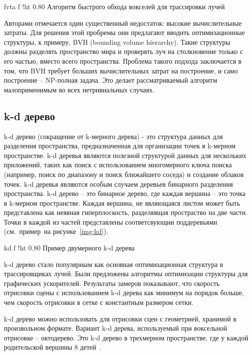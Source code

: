     {fvta}
    {f}
    {!ht}
    {0.80\textwidth}
    {Алгоритм быстрого обхода вокселей для трассировки лучей~\cite{AFVTAfRT}}

Авторами отмечается один существенный недостаток: высокие вычислительные затраты. Для решения
этой пробремы они предлагают вводить оптимизационные структуры, к примеру, BVH (bounding volume hierarchy). 
Такие структуры должны разделять пространство мира
и проверять луч на столкновение только с его частью, вместо всего пространства. Проблема такого 
подхода заключается в том, что BVH требует больших вычислительных затрат на построение, и
само построение -- NP-полная задача. Это делает рассматриваемый алгоритм малоприменимым во 
всех нетривиальных случаях.

\subsection{k-d дерево}

k-d дерево (сокращение от k-мерного дерева) - это структура данных 
для разделения пространства, предназначенная для организации точек в 
k-мерном пространстве. k-d деревья являются полезной структурой данных 
для нескольких приложений, таких как поиск с использованием многомерного 
ключа поиска (например, поиск по диапазону и поиск ближайшего соседа) и 
создание облаков точек. k-d деревья являются особым случаем деревьев 
бинарного разделения пространства. k-d дерево -- это бинарное дерево, где каждая 
вершина -- это точка в k-мерном пространстве. Каждая вершина, не являющаяся листом 
может быть представлена как неявная гиперплоскость, разделяящая простраство на две части.
Точки в каждой из частей представлены соответсвующии поддеревьями (см.~пример~на
рисунке~\ref{img:kd}).

    {kd}
    {f}
    {!ht}
    {0.80\textwidth}
    {Пример двумерного k-d дерева}

k-d дерево стало популярным как основная оптимизационная структура в 
трассировщиках лучей. Были предложены алгоритмы оптимизации структуры для графических
ускорителей. Результаты замеров показывают, что скорость отрисовки сцены с использованием
k-d дерева как минимум на порядок больше, чем скорость отрисовки в сетке с константным 
размером сетки.

k-d дерево можно использовать для отрисовки сцен с геометрией, хранимой в произвольном 
формате. Вариант k-d дерева, используемый при воксельной отрисовке -- октодерево. Это k-d дерево в трехмерном пространстве, где у каждой родительской вершины 8 детей~\cite{KDTASfaGR}.

